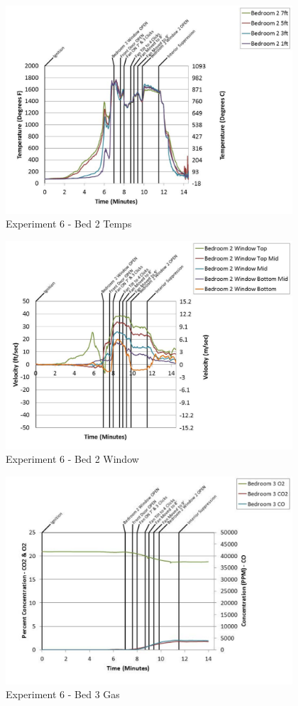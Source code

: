 \documentclass{article}
\begin{document}
\begin{appendices}
	\clearpage

	\begin{figure}[h!]
		\centering
		\includegraphics[height=3.05in]{0_Images/Results_Charts/Exp_6_Charts/Bed2Temps.pdf}
		\caption{Experiment 6 - Bed 2 Temps}
	\end{figure}
 

	\begin{figure}[h!]
		\centering
		\includegraphics[height=3.05in]{0_Images/Results_Charts/Exp_6_Charts/Bed2Window.pdf}
		\caption{Experiment 6 - Bed 2 Window}
	\end{figure}
 
	\clearpage

	\begin{figure}[h!]
		\centering
		\includegraphics[height=3.05in]{0_Images/Results_Charts/Exp_6_Charts/Bed3Gas.pdf}
		\caption{Experiment 6 - Bed 3 Gas}
	\end{figure}
 


\end{appendices}
\end{document}
